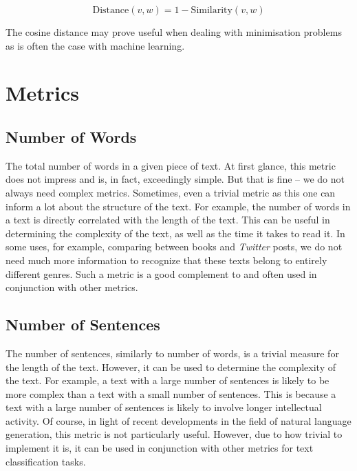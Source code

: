 $$ \text{Distance}(v,w) = 1 - \text{Similarity}(v,w) $$

The cosine distance may prove useful when dealing with minimisation problems as is often the case with machine learning.

\section{Metrics}
\label{sec:metrics}

\subsection{Number of Words}
The total number of words in a given piece of text. At first glance, this metric does not impress and is, in fact, exceedingly simple. But that is fine -- we do not always need complex metrics. Sometimes, even a trivial metric as this one can inform a lot about the structure of the text. For example, the number of words in a text is directly correlated with the length of the text. This can be useful in determining the complexity of the text, as well as the time it takes to read it. In some uses, for example, comparing between books and \textit{Twitter} posts, we do not need much more information to recognize that these texts belong to entirely different genres. Such a metric is a good complement to and often used in conjunction with other metrics.

\subsection{Number of Sentences}
The number of sentences, similarly to number of words, is a trivial measure for the length of the text. However, it can be used to determine the complexity of the text. For example, a text with a large number of sentences is likely to be more complex than a text with a small number of sentences. This is because a text with a large number of sentences is likely to involve longer intellectual activity. Of course, in light of recent developments in the field of natural language generation, this metric is not particularly useful. However, due to how trivial to implement it is, it can be used in conjunction with other metrics for text classification tasks.

